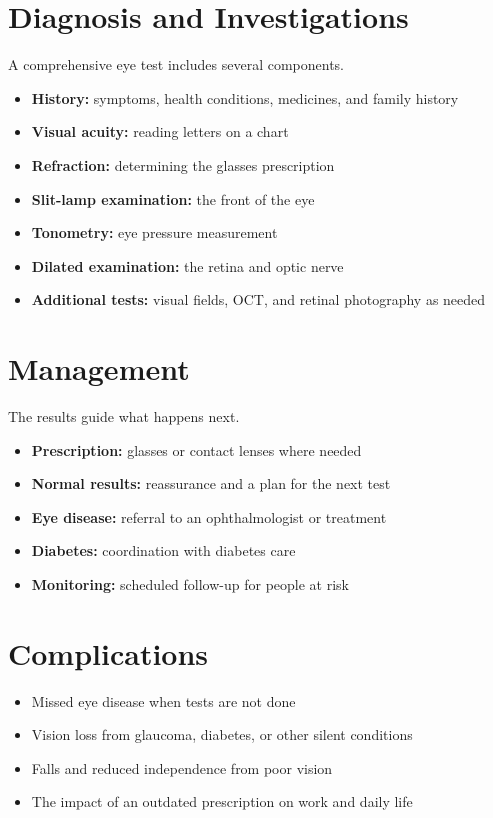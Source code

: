 \section*{Diagnosis and Investigations}
A comprehensive eye test includes several components.
\begin{itemize}
    \item \textbf{History:} symptoms, health conditions, medicines, and family history
    \item \textbf{Visual acuity:} reading letters on a chart
    \item \textbf{Refraction:} determining the glasses prescription
    \item \textbf{Slit-lamp examination:} the front of the eye
    \item \textbf{Tonometry:} eye pressure measurement
    \item \textbf{Dilated examination:} the retina and optic nerve
    \item \textbf{Additional tests:} visual fields, OCT, and retinal photography as needed
\end{itemize}

\section*{Management}
The results guide what happens next.
\begin{itemize}
    \item \textbf{Prescription:} glasses or contact lenses where needed
    \item \textbf{Normal results:} reassurance and a plan for the next test
    \item \textbf{Eye disease:} referral to an ophthalmologist or treatment
    \item \textbf{Diabetes:} coordination with diabetes care
    \item \textbf{Monitoring:} scheduled follow-up for people at risk
\end{itemize}

\section*{Complications}
\begin{itemize}
    \item Missed eye disease when tests are not done
    \item Vision loss from glaucoma, diabetes, or other silent conditions
    \item Falls and reduced independence from poor vision
    \item The impact of an outdated prescription on work and daily life
\end{itemize}

